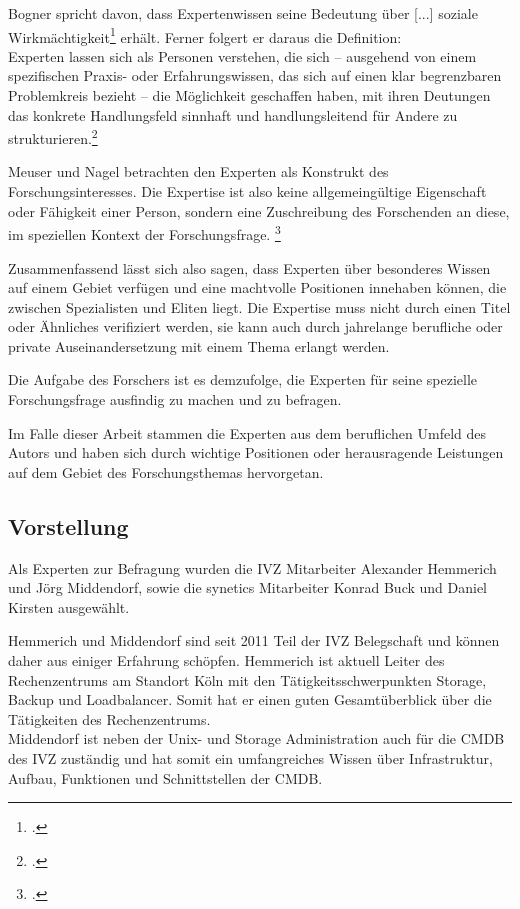 Bogner spricht davon, dass Expertenwissen \glqq seine Bedeutung über [...] soziale Wirkmächtigkeit\grqq{}\footcite[][13]{Bogner_2014_Interview} erhält.
Ferner folgert er daraus die Definition:\\ \glqq Experten lassen sich als Personen verstehen, die sich -- ausgehend von einem spezifischen Praxis- oder Erfahrungswissen, das sich auf einen klar begrenzbaren Problemkreis bezieht -- die Möglichkeit geschaffen haben, mit ihren Deutungen das konkrete Handlungsfeld sinnhaft und handlungsleitend für Andere zu strukturieren.\grqq{}\footcite[][13]{Bogner_2014_Interview}

Meuser und Nagel betrachten den Experten als Konstrukt des Forschungsinteresses. Die Expertise ist also keine allgemeingültige Eigenschaft oder Fähigkeit einer Person, sondern eine Zuschreibung des Forschenden an diese, im speziellen Kontext der Forschungsfrage. \footcite[Vgl.][181]{Meuser_1994_Interview}

Zusammenfassend lässt sich also sagen, dass Experten über besonderes Wissen auf einem Gebiet verfügen und eine machtvolle Positionen innehaben können, die zwischen Spezialisten und Eliten liegt. Die Expertise muss nicht durch einen Titel oder Ähnliches verifiziert werden, sie kann auch durch jahrelange berufliche oder private Auseinandersetzung mit einem Thema erlangt werden.

Die Aufgabe des Forschers ist es demzufolge, die Experten für seine spezielle Forschungsfrage ausfindig zu machen und zu befragen.

Im Falle dieser Arbeit stammen die Experten aus dem beruflichen Umfeld des Autors und haben sich durch wichtige Positionen oder herausragende Leistungen auf dem Gebiet des Forschungsthemas hervorgetan.



\subsection{Vorstellung}
Als Experten zur Befragung wurden die \acs{IVZ} Mitarbeiter Alexander Hemmerich und Jörg Middendorf, sowie die synetics Mitarbeiter Konrad Buck und Daniel Kirsten ausgewählt.

Hemmerich und Middendorf sind seit 2011 Teil der \acs{IVZ} Belegschaft und können daher aus einiger Erfahrung schöpfen. Hemmerich ist aktuell Leiter des Rechenzentrums am Standort Köln mit den Tätigkeitsschwerpunkten Storage, Backup und Loadbalancer. Somit hat er einen guten Gesamtüberblick über die Tätigkeiten des Rechenzentrums.\\
Middendorf ist neben der Unix- und Storage Administration auch für die \acs{CMDB} des \acs{IVZ} zuständig und hat somit ein umfangreiches Wissen über Infrastruktur, Aufbau, Funktionen und Schnittstellen der \acs{CMDB}.

